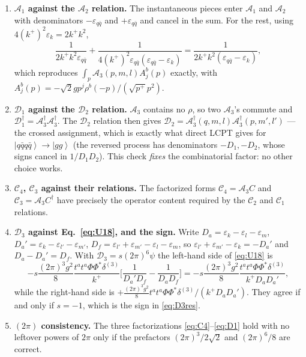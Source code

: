 \documentclass[11pt]{article}
\newcommand{\eps}{\varepsilon}
\newcommand{\dg}{\dagger}
\newcommand{\dthree}{\delta^{(3)}}
\newcommand{\ket}[1]{\left|#1\right\rangle}
\newcommand{\Ph}{\Phi}
\newcommand{\A}{\mathcal{A}}
\newcommand{\C}{\mathcal{C}}
\newcommand{\D}{\mathcal{D}}
\begin{document}
\begin{enumerate}
\item[\bf 1.] \textbf{$\A_{1}$ against the $\A_{2}$ relation.} The instantaneous pieces enter
$\A_{1}$ and $\A_{2}$ with denominators $-\eps_{q\bar q}$ and $+\eps_{q\bar q}$ and cancel in the
sum. For the rest, using $4(k^{+})^{2}\eps_{k}=2k^{+}k^{2}$,
\[
\frac{1}{2k^{+}k^{2}\eps_{q\bar q}}+\frac{1}{4(k^{+})^{2}\eps_{q\bar q}(\eps_{q\bar q}-\eps_{k})}
=\frac{1}{2k^{+}k^{2}(\eps_{q\bar q}-\eps_{k})},
\]
which reproduces $\int_{p}\A_{3}(p,m,l)A^{b}_{j}(p)$ exactly, with
$A^{b}_{j}(p)=-\sqrt2 g p^{j}\rho^{b}(-p)/(\sqrt{p^{+}}p^{2})$.

\item[\bf 2.] \textbf{$\D_{1}$ against the $\D_{2}$ relation.} $\A_{3}$ contains no $\rho$, so
two $\A_{3}$'s commute and $\D_{1}^{\dg}=\A^{\dg}_{3}\A^{\dg}_{3}$. The $\D_{2}$ relation then
gives $\D_{2}=\A^{\dg}_{3}(q,m,l)\A^{\dg}_{3}(p,m',l')$ --- the crossed assignment, which is
exactly what direct LCPT gives for $\ket{q\bar qq\bar q}\to\ket{gg}$ (the reversed process has
denominators $-D_{1},-D_{2}$, whose signs cancel in $1/D_{1}D_{2}$). This check \emph{fixes} the
combinatorial factor: no other choice works.

\item[\bf 3.] \textbf{$\C_{4}$, $\C_{3}$ against their relations.} The factorized forms
$\C_{4}=\A_{3}C$ and $\C_{3}=\A_{3}C^{\dg}$ have precisely the operator content required by the
$\C_{2}$ and $\C_{1}$ relations.

\item[\bf 4.] \textbf{$\D_{3}$ against Eq.~\eqref{eq:U18}, and the sign.} Write
$D_{a}=\eps_{k}-\eps_{l}-\eps_{m}$, $D_{a}'=\eps_{k}-\eps_{l'}-\eps_{m'}$,
$D_{f}=\eps_{l'}+\eps_{m'}-\eps_{l}-\eps_{m}$, so $\eps_{l'}+\eps_{m'}-\eps_{k}=-D_{a}'$ and
$D_{a}-D_{a}'=D_{f}$. With $\D_{3}=s(2\pi)^{6}\psi$ the left-hand side of \eqref{eq:U18} is
\[
-s\frac{(2\pi)^{3}g^{2}}{8}\frac{t^{a}t^{a}\Ph\Ph^{*}\dthree}{k^{+}}
\Big[\frac{1}{D_{a}'D_{f}}-\frac{1}{D_{a}D_{f}}\Big]
=-s\frac{(2\pi)^{3}g^{2}}{8}\frac{t^{a}t^{a}\Ph\Ph^{*}\dthree}{k^{+}D_{a}D_{a}'},
\]
while the right-hand side is $+\tfrac{(2\pi)^{3}g^{2}}{8}t^{a}t^{a}\Ph\Ph^{*}\dthree/(k^{+}D_{a}D_{a}')$.
They agree if and only if $s=-1$, which is the sign in \eqref{eq:D3res}.

\item[\bf 5.] \textbf{$(2\pi)$ consistency.} The three factorizations \eqref{eq:C4}--\eqref{eq:D1}
hold with no leftover powers of $2\pi$ only if the prefactors
$(2\pi)^{3}/2\sqrt2$ and $(2\pi)^{6}/8$ are correct.
\end{enumerate}
\end{document}

